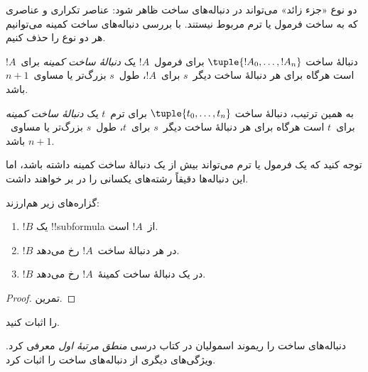 \documentclass[../../../include/open-logic-section]{subfiles}
\begin{document}
دو نوع «جزء زائد» می‌تواند در دنباله‌های ساخت ظاهر شود: عناصر تکراری و
عناصری که به ساخت فرمول یا ترم مربوط نیستند. با بررسی دنباله‌های ساخت کمینه
می‌توانیم هر دو نوع را حذف کنیم.

\begin{defn}
دنبالهٔ ساخت $\tuple{!A_0, \ldots, !A_n}$ برای فرمول~$!A$ یک
\emph{دنبالهٔ ساخت کمینه} برای~$!A$ است هرگاه برای هر دنبالهٔ ساخت
دیگر~$s$ برای~$!A$، طول~$s$ بزرگ‌تر یا مساوی~$n+1$ باشد.

به همین ترتیب، دنبالهٔ ساخت $\tuple{t_0, \ldots, t_n}$ برای ترم~$t$ یک
\emph{دنبالهٔ ساخت کمینه} برای~$t$ است هرگاه برای هر دنبالهٔ ساخت
دیگر~$s$ برای~$t$، طول~$s$ بزرگ‌تر یا مساوی~$n+1$ باشد.
\end{defn}

توجه کنید که یک فرمول یا ترم می‌تواند بیش از یک دنبالهٔ ساخت کمینه داشته
باشد، اما این دنباله‌ها دقیقاً رشته‌های یکسانی را در بر خواهند داشت.

\begin{prop}
گزاره‌های زیر هم‌ارزند:
\begin{enumerate}
    \item $!B$ یک !!{subformula} از~$!A$ است.
    \item $!B$ در هر دنبالهٔ ساخت~$!A$ رخ می‌دهد.
    \item $!B$ در یک دنبالهٔ ساخت کمینهٔ~$!A$ رخ می‌دهد.
\end{enumerate}
\end{prop}

\begin{proof}
تمرین.
\end{proof}

\begin{prob}
 را اثبات کنید.
\end{prob}

\begin{history}
دنباله‌های ساخت را ریموند اسمولیان در کتاب درسی \emph{منطق مرتبهٔ اول}
\citep{Smullyan1968} معرفی کرد. ویژگی‌های دیگری از دنباله‌های ساخت را
\citet{Zuckerman1973} اثبات کرد.
\end{history}
\end{document}
